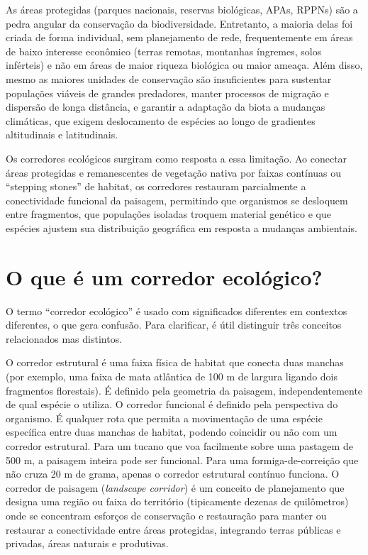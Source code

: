 \documentclass[
  portuguese,
  11pt,
  a4paper,
  open=any]{scrbook}
\begin{document}
As áreas protegidas (parques nacionais, reservas biológicas, APAs,
RPPNs) são a pedra angular da conservação da biodiversidade. Entretanto,
a maioria delas foi criada de forma individual, sem planejamento de
rede, frequentemente em áreas de baixo interesse econômico (terras
remotas, montanhas íngremes, solos inférteis) e não em áreas de maior
riqueza biológica ou maior ameaça. Além disso, mesmo as maiores unidades
de conservação são insuficientes para sustentar populações viáveis de
grandes predadores, manter processos de migração e dispersão de longa
distância, e garantir a adaptação da biota a mudanças climáticas, que
exigem deslocamento de espécies ao longo de gradientes altitudinais e
latitudinais.

Os corredores ecológicos surgiram como resposta a essa limitação. Ao
conectar áreas protegidas e remanescentes de vegetação nativa por faixas
contínuas ou ``stepping stones'' de habitat, os corredores restauram
parcialmente a conectividade funcional da paisagem, permitindo que
organismos se desloquem entre fragmentos, que populações isoladas
troquem material genético e que espécies ajustem sua distribuição
geográfica em resposta a mudanças ambientais.

\section{O que é um corredor
ecológico?}\label{o-que-uxe9-um-corredor-ecoluxf3gico}

O termo ``corredor ecológico'' é usado com significados diferentes em
contextos diferentes, o que gera confusão. Para clarificar, é útil
distinguir três conceitos relacionados mas distintos.

O corredor estrutural é uma faixa física de habitat que conecta duas
manchas (por exemplo, uma faixa de mata atlântica de 100 m de largura
ligando dois fragmentos florestais). É definido pela geometria da
paisagem, independentemente de qual espécie o utiliza. O corredor
funcional é definido pela perspectiva do organismo. É qualquer rota que
permita a movimentação de uma espécie específica entre duas manchas de
habitat, podendo coincidir ou não com um corredor estrutural. Para um
tucano que voa facilmente sobre uma pastagem de 500 m, a paisagem
inteira pode ser funcional. Para uma formiga-de-correição que não cruza
20 m de grama, apenas o corredor estrutural contínuo funciona. O
corredor de paisagem (\emph{landscape corridor}) é um conceito de
planejamento que designa uma região ou faixa do território (tipicamente
dezenas de quilômetros) onde se concentram esforços de conservação e
restauração para manter ou restaurar a conectividade entre áreas
protegidas, integrando terras públicas e privadas, áreas naturais e
produtivas.
\end{document}
